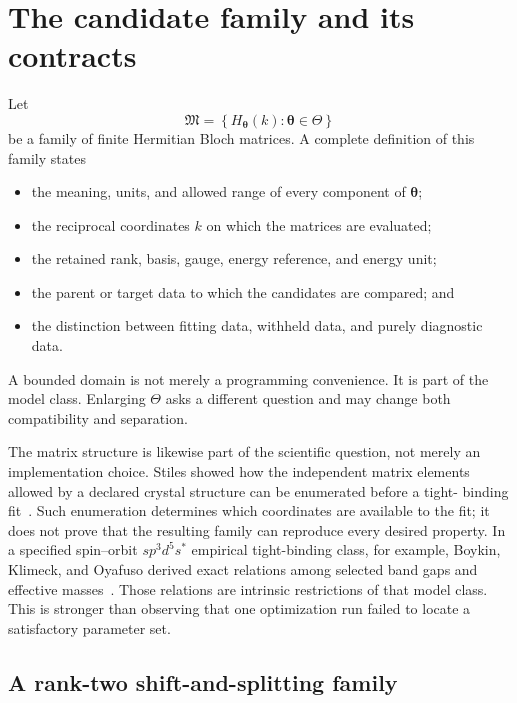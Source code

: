 \section{The candidate family and its contracts}

Let
\begin{equation}
  \mathfrak M
  =
  \left\{
    H_{\boldsymbol\theta}(k):
    \boldsymbol\theta\in\Theta
  \right\}
\end{equation}
be a family of finite Hermitian Bloch matrices. A complete definition of this
family states
\begin{itemize}
  \item the meaning, units, and allowed range of every component of
        $\boldsymbol\theta$;
  \item the reciprocal coordinates $k$ on which the matrices are evaluated;
  \item the retained rank, basis, gauge, energy reference, and energy unit;
  \item the parent or target data to which the candidates are compared; and
  \item the distinction between fitting data, withheld data, and purely
        diagnostic data.
\end{itemize}
A bounded domain is not merely a programming convenience. It is part of the
model class. Enlarging $\Theta$ asks a different question and may change both
compatibility and separation.

The matrix structure is likewise part of the scientific question, not merely
an implementation choice. Stiles showed how the independent matrix elements
allowed by a declared crystal structure can be enumerated before a tight-
binding fit~\cite{stiles1997}. Such enumeration determines which coordinates
are available to the fit; it does not prove that the resulting family can
reproduce every desired property. In a specified spin--orbit
$sp^3d^5s^{\ast}$ empirical tight-binding class, for example, Boykin, Klimeck,
and Oyafuso derived exact relations among selected band gaps and effective
masses~\cite{boykinKlimeckOyafuso2004}. Those relations are intrinsic
restrictions of that model class. This is stronger than observing that one
optimization run failed to locate a satisfactory parameter set.

\subsection{A rank-two shift-and-splitting family}


